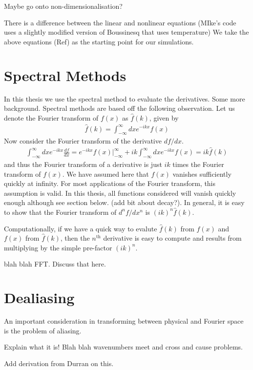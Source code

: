 Maybe go onto non-dimensionalisation? 

There is a difference between the linear and nonlinear equations (MIke's code uses a slightly modified version of Boussinesq that uses temperature) 
We take the above equations (Ref) as the starting point for our simulations. 

\section{Spectral Methods}
In this thesis we use the spectral method to evaluate the derivatives. Some more background. Spectral methods are based off the following observation. Let us denote the Fourier transform of $f(x)$ as $\hat{f}(k)$, given by
\begin{align}
\hat{f}(k) = \int_{-\infty}^{\infty}dxe^{-ikx}f(x)
\end{align}
Now consider the Fourier transform of the derivative $df/dx$. 
\begin{align}
\int_{-\infty}^{\infty}dxe^{-ikx}\frac{df}{dx}=e^{-ikx}f(x)\bigg|_{-\infty}^{\infty} + ik\int_{-\infty}^{\infty}dxe^{-ikx}f(x)= ik\hat{f}(k)
\end{align}
and thus the Fourier transform of a derivative is just $ik$ times the Fourier transform of $f(x)$. We have assumed here that $f(x)$ vanishes sufficiently quickly at infinity. For most applications of the Fourier transform, this assumption is valid. In this thesis, all functions considered will vanish quickly enough although see section below. (add bit about decay?). In general, it is easy to show that the Fourier transform of $d^{n}f/dx^{n}$ is $(ik)^{n}\hat{f}(k)$. 

Computationally, if we have a quick way to evalute $\hat{f}(k)$ from $f(x)$ and $f(x)$ from $\hat{f}(k)$, then the $n^{\text{th}}$ derivative is easy to compute and results from multiplying by the simple pre-factor $(ik)^{n}$. 

blah blah FFT. Discuss that here.


\section{Dealiasing} 
An important consideration in transforming between physical and Fourier space is the problem of aliasing.

Explain what it is! Blah blah wavenumbers meet and cross and cause problems.

Add derivation from Durran on this.

